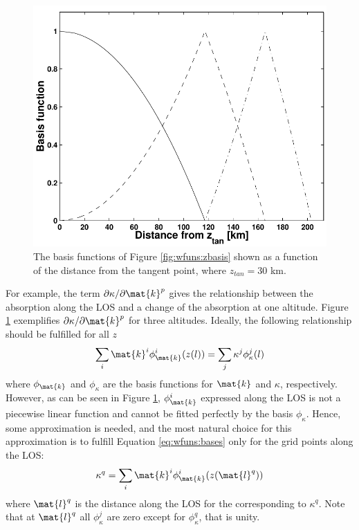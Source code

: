  \begin{figure}[t]
  \begin{center}
   \includegraphics*[width=0.7\hsize]{Figs/fig_absbasis_l}
   \caption{The basis functions of Figure \ref{fig:wfuns:zbasis} shown
            as a function of the distance from the tangent point, where
            $z_{tan}=30$ km.}
   \label{fig:wfuns:lbasis}  
  \end{center}
 \end{figure}
 For example, the term $\partial\kappa/ \partial \mat{k}^p$ gives the
 relationship between the absorption along the LOS and a change of the
 absorption at one altitude.  Figure \ref{fig:wfuns:lbasis}
 exemplifies $\partial\kappa/ \partial \mat{k}^p$ for three altitudes.
 Ideally, the following relationship should be fulfilled for all $z$
 \begin{equation}
   \sum_i\mat{k}^i\phi^i_\mat{k}(z(l)) = \sum_j \kappa^j\phi^j_{\kappa}(l)
  \label{eq:wfuns:bases}
 \end{equation}
 where $\phi_\mat{k}$ and $\phi_{\kappa}$ are the basis functions for
 $\mat{k}$ and $\kappa$, respectively. However, as can be seen in
 Figure \ref{fig:wfuns:lbasis}, $\phi^i_\mat{k}$ expressed along the
 LOS is not a piecewise linear function and cannot be fitted perfectly
 by the basis $\phi_{\kappa}$. Hence, some approximation is needed,
 and the most natural choice for this approximation is to fulfill
 Equation \ref{eq:wfuns:bases} only for the grid points along the LOS:
 \begin{equation}
   \kappa^q = \sum_i\mat{k}^i\phi^i_\mat{k}(z(\mat{l}^q))
 \end{equation}
 where $\mat{l}^q$ is the distance along the LOS for the corresponding to
 $\kappa^q$. Note that at $\mat{l}^q$ all $\phi_{\kappa}^j$ are zero except
 for $\phi_{\kappa}^q$, that is unity.

